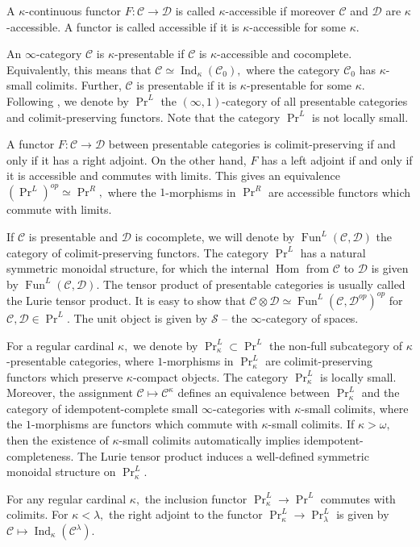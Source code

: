 \documentclass[11pt,leqno]{amsart}
\numberwithin{equation}{section}
\def\Hom{\operatorname{Hom}}
\newcommand{\cD}{{\mathcal D}}
\newcommand{\cC}{{\mathcal C}}
\newcommand{\cS}{{\mathcal S}}
\newcommand{\Fun}{\operatorname{Fun}}
\newcommand{\Ind}{\operatorname{Ind}}
\begin{document}
A $\kappa$-continuous functor $F:\cC\to\cD$ is called $\kappa$-accessible if moreover $\cC$ and $\cD$ are $\kappa$-accessible. A functor is called accessible if it is $\kappa$-accessible for some $\kappa.$

An $\infty$-category $\cC$ is $\kappa$-presentable if $\cC$ is $\kappa$-accessible and cocomplete. Equivalently, this means that $\cC\simeq\Ind_{\kappa}(\cC_0),$ where the category $\cC_0$ has $\kappa$-small colimits. Further, $\cC$ is presentable if it is $\kappa$-presentable for some $\kappa.$ Following \cite{Lur09}, we denote by $\Pr^L$ the $(\infty,1)$-category of all presentable categories and colimit-preserving functors. Note that the category $\Pr^L$ is not locally small. 

A functor $F:\cC\to\cD$ between presentable categories is colimit-preserving if and only if it has a right adjoint. On the other hand, $F$ has a left adjoint if and only if it is accessible and commutes with limits. This gives an equivalence $(\Pr^L)^{op}\simeq\Pr^R,$ where the $1$-morphisms in $\Pr^R$ are accessible functors which commute with limits.

If $\cC$ is presentable and $\cD$ is cocomplete, we will denote by $\Fun^L(\cC,\cD)$ the category of colimit-preserving functors. The category $\Pr^L$ has a natural symmetric monoidal structure, for which the internal $\Hom$ from $\cC$ to $\cD$ is given by $\Fun^L(\cC,\cD).$ The tensor product of presentable categories is usually called the Lurie tensor product. It is easy to show that $\cC\otimes\cD\simeq\Fun^L(\cC,\cD^{op})^{op}$ for $\cC,\cD\in\Pr^L.$ The unit object is given by $\cS$ -- the $\infty$-category of spaces.

For a regular cardinal $\kappa,$ we denote by $\Pr^L_{\kappa}\subset \Pr^L$ the non-full subcategory of $\kappa$-presentable categories, where $1$-morphisms in $\Pr^L_{\kappa}$ are colimit-preserving functors which preserve $\kappa$-compact objects. The category $\Pr^L_{\kappa}$ is locally small. Moreover, the assignment $\cC\mapsto\cC^{\kappa}$ defines an equivalence between $\Pr^L_{\kappa}$ and the category of idempotent-complete small $\infty$-categories with $\kappa$-small colimits, where the $1$-morphisms are functors which commute with $\kappa$-small colimits. If $\kappa>\omega,$ then the existence of $\kappa$-small colimits automatically implies idempotent-completeness. The Lurie tensor product induces a well-defined symmetric monoidal structure on $\Pr^L_{\kappa}.$ 

For any regular cardinal $\kappa,$ the inclusion functor $\Pr^L_{\kappa}\to \Pr^L$ commutes with colimits. For $\kappa<\lambda,$ the right adjoint to the functor $\Pr^L_{\kappa}\to \Pr^L_{\lambda}$ is given by $\cC\mapsto \Ind_{\kappa}(\cC^{\lambda}).$
\end{document}
